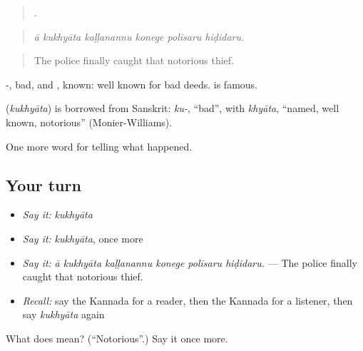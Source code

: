 \begin{quote}
     .
\end{quote}

\begin{quote}
\emph{ā kukhyāta kaḷḷanannu konege polīsaru hiḍidaru.}
\end{quote}

\begin{quote}
The police finally caught that notorious thief.
\end{quote}

-, bad, and , known: well known for bad deeds.  is famous.

\begin{cousinweb}
\textbf{} (\emph{kukhyāta}) is borrowed from Sanskrit: \emph{ku-}, \textquotedblleft{}bad\textquotedblright{}, with \emph{khyāta}, \textquotedblleft{}named, well known, notorious\textquotedblright{} (Monier-Williams).
\end{cousinweb}

\begin{grammarlens}[title={What you've built}]
One more word for telling what happened.
\end{grammarlens}

\subsection*{Your turn}
\begin{itemize}
\raggedright
  \item \emph{Say it:} \emph{kukhyāta}
  \item \emph{Say it:} \emph{kukhyāta}, once more
  \item \emph{Say it:} \emph{ā kukhyāta kaḷḷanannu konege polīsaru hiḍidaru.} — The police finally caught that notorious thief.
  \item \emph{Recall:} say the Kannada for a reader, then the Kannada for a listener, then say \emph{kukhyāta} again
\end{itemize}

\begin{tcolorbox}[breakable,colback=teal!4,colframe=teal!35!black,title={Before you move on}]
What does  mean? (\textquotedblleft{}Notorious\textquotedblright{}.) Say it once more.
\end{tcolorbox}
